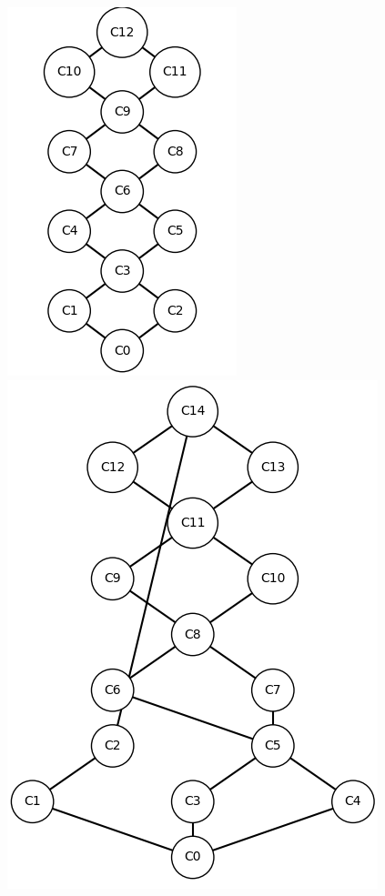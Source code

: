 \documentclass[runningheads,a4paper]{llncs}
\begin{document}
\begin{example}
\begin{figure}
\begin{minipage}{\textwidth}
\begin{minipage}{0.2\textwidth}
			\includegraphics[height = \textwidth]{im/ex-ma2-other-contexts-2.png}
		\end{minipage}
		\begin{minipage}{0.2\textwidth}
			\centering
			\includegraphics[height = \textwidth]{im/ex-ma2-other-contexts-1+2.png}
		\end{minipage}
	\end{minipage}


\end{figure}
\end{example}
\end{document}
